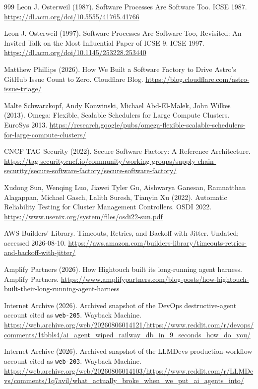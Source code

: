 \begin{thebibliography}{999}
 Leon J. Osterweil (1987). Software Processes Are Software Too. ICSE 1987. \url{https://dl.acm.org/doi/10.5555/41765.41766}

 Leon J. Osterweil (1997). Software Processes Are Software Too, Revisited: An Invited Talk on the Most Influential Paper of ICSE 9. ICSE 1997. \url{https://dl.acm.org/doi/10.1145/253228.253440}

 Matthew Phillips (2026). How We Built a Software Factory to Drive Astro's GitHub Issue Count to Zero. Cloudflare Blog. \url{https://blog.cloudflare.com/astro-issue-triage/}

 Malte Schwarzkopf, Andy Konwinski, Michael Abd-El-Malek, John Wilkes (2013). Omega: Flexible, Scalable Schedulers for Large Compute Clusters. EuroSys 2013. \url{https://research.google/pubs/omega-flexible-scalable-schedulers-for-large-compute-clusters/}

 CNCF TAG Security (2022). Secure Software Factory: A Reference Architecture. \url{https://tag-security.cncf.io/community/working-groups/supply-chain-security/secure-software-factory/secure-software-factory/}

 Xudong Sun, Wenqing Luo, Jiawei Tyler Gu, Aishwarya Ganesan, Ramnatthan Alagappan, Michael Gasch, Lalith Suresh, Tianyin Xu (2022). Automatic Reliability Testing for Cluster Management Controllers. OSDI 2022. \url{https://www.usenix.org/system/files/osdi22-sun.pdf}

 AWS Builders' Library. Timeouts, Retries, and Backoff with Jitter. Undated; accessed 2026-08-10. \url{https://aws.amazon.com/builders-library/timeouts-retries-and-backoff-with-jitter/}

 Amplify Partners (2026). How Hightouch built its long-running agent harness. Amplify Partners. \url{https://www.amplifypartners.com/blog-posts/how-hightouch-built-their-long-running-agent-harness}

 Internet Archive (2026). Archived snapshot of the DevOps destructive-agent account cited as \texttt{web-205}. Wayback Machine. \url{https://web.archive.org/web/20260806014121/https://www.reddit.com/r/devops/comments/1tbbls4/ai_agent_wiped_railway_db_in_9_seconds_how_do_you/}

 Internet Archive (2026). Archived snapshot of the LLMDevs production-workflow account cited as \texttt{web-203}. Wayback Machine. \url{https://web.archive.org/web/20260806014103/https://www.reddit.com/r/LLMDevs/comments/1q7avil/what_actually_broke_when_we_put_ai_agents_into/}


\end{thebibliography}
